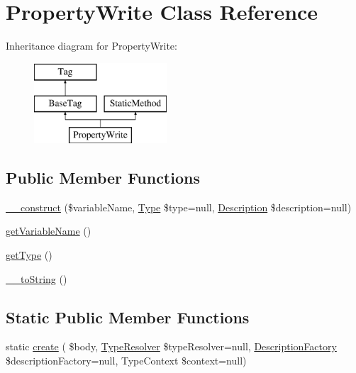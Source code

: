 \hypertarget{classphp_documentor_1_1_reflection_1_1_doc_block_1_1_tags_1_1_property_write}{}\section{Property\+Write Class Reference}
\label{classphp_documentor_1_1_reflection_1_1_doc_block_1_1_tags_1_1_property_write}
Inheritance diagram for Property\+Write\+:\begin{figure}[H]
\begin{center}
\leavevmode
\includegraphics[height=3.000000cm]{classphp_documentor_1_1_reflection_1_1_doc_block_1_1_tags_1_1_property_write}
\end{center}
\end{figure}
\subsection*{Public Member Functions}
\begin{DoxyCompactItemize}
\item 
\mbox{\hyperlink{classphp_documentor_1_1_reflection_1_1_doc_block_1_1_tags_1_1_property_write_a1e5de5b31a43e9ffe064e27942aa5e63}{\+\_\+\+\_\+construct}} (\$variable\+Name, \mbox{\hyperlink{interfacephp_documentor_1_1_reflection_1_1_type}{Type}} \$type=null, \mbox{\hyperlink{classphp_documentor_1_1_reflection_1_1_doc_block_1_1_description}{Description}} \$description=null)
\item 
\mbox{\hyperlink{classphp_documentor_1_1_reflection_1_1_doc_block_1_1_tags_1_1_property_write_a20af85a4f4041ed681b095e1427b2a1d}{get\+Variable\+Name}} ()
\item 
\mbox{\hyperlink{classphp_documentor_1_1_reflection_1_1_doc_block_1_1_tags_1_1_property_write_a830b5c75df72b32396701bc563fbe3c7}{get\+Type}} ()
\item 
\mbox{\hyperlink{classphp_documentor_1_1_reflection_1_1_doc_block_1_1_tags_1_1_property_write_a7516ca30af0db3cdbf9a7739b48ce91d}{\+\_\+\+\_\+to\+String}} ()
\end{DoxyCompactItemize}
\subsection*{Static Public Member Functions}
\begin{DoxyCompactItemize}
\item 
static \mbox{\hyperlink{classphp_documentor_1_1_reflection_1_1_doc_block_1_1_tags_1_1_property_write_a01b1e5c3741d05766720d8cb6d900172}{create}} ( \$body, \mbox{\hyperlink{classphp_documentor_1_1_reflection_1_1_type_resolver}{Type\+Resolver}} \$type\+Resolver=null, \mbox{\hyperlink{classphp_documentor_1_1_reflection_1_1_doc_block_1_1_description_factory}{Description\+Factory}} \$description\+Factory=null, Type\+Context \$context=null)
\end{DoxyCompactItemize}
